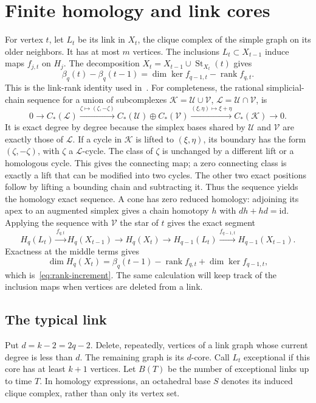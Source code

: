 \documentclass[11pt]{article}
\theoremstyle{remark}\newtheorem{remark}[theorem]{Remark}
\DeclareMathOperator{\rank}{rank}
\begin{document}
\section{Finite homology and link cores}\label{sec:homology}
For vertex $t$, let $L_t$ be its link in $X_t$, the clique complex of the
simple graph on its older neighbors. It has at most $m$ vertices.
The inclusions $L_t\subset X_{t-1}$ induce maps $f_{j,t}$ on $H_j$.
The decomposition $X_t=X_{t-1}\cup\operatorname{St}_{X_t}(t)$ gives
\begin{equation}\label{eq:rank-increment}
 \beta_q(t)-\beta_q(t-1)
 =\dim\ker f_{q-1,t}-\rank f_{q,t}.
\end{equation}
This is the link-rank identity used in~\cite[Proposition~14 of the
author preprint]{ssyh}.
For completeness, the rational simplicial-chain sequence for a union of
subcomplexes $\mathcal K=\mathcal U\cup\mathcal V$, $\mathcal L=\mathcal U\cap\mathcal V$, is
\[
 0\longrightarrow C_*(\mathcal L)\xrightarrow{\zeta\mapsto(\zeta,-\zeta)}
 C_*(\mathcal U)\oplus C_*(\mathcal V)\xrightarrow{(\xi,\eta)\mapsto\xi+\eta}
 C_*(\mathcal K)\longrightarrow0.
\]
It is exact degree by degree because the simplex bases shared by $\mathcal U$ and
$\mathcal V$ are exactly those of $\mathcal L$. If a cycle in $\mathcal K$ is lifted to $(\xi,\eta)$,
its boundary has the form $(\zeta,-\zeta)$, with $\zeta$ a $\mathcal L$-cycle. The class of
$\zeta$ is unchanged by a different lift or a homologous cycle. This gives the
connecting map; a zero connecting class is exactly a lift that can be
modified into two cycles. The other two exact positions follow by lifting
a bounding chain and subtracting it. Thus the sequence yields the homology
exact sequence. A cone has zero reduced homology: adjoining its apex to
an augmented simplex gives a chain homotopy $h$ with $dh+hd=\mathrm{id}$.
Applying the sequence with $\mathcal V$ the star of $t$ gives the exact segment
\[
 H_q(L_t)\xrightarrow{f_{q,t}}H_q(X_{t-1})\longrightarrow H_q(X_t)
 \longrightarrow H_{q-1}(L_t)\xrightarrow{f_{q-1,t}}H_{q-1}(X_{t-1}).
\]
Exactness at the middle terms gives
\[
 \dim H_q(X_t)=\beta_q(t-1)-\rank f_{q,t}+\dim\ker f_{q-1,t},
\]
which is~\eqref{eq:rank-increment}. The same calculation will keep track of the inclusion
maps when vertices are deleted from a link.

\subsection{The typical link}
Put $d=k-2=2q-2$. Delete, repeatedly, vertices of a link graph whose
current degree is less than $d$. The remaining graph is its $d$-core.
Call $L_t$ exceptional if this core has at least $k+1$ vertices.
Let $B(T)$ be the number of exceptional links up to time $T$.
In homology expressions, an octahedral base $S$ denotes its induced clique
complex, rather than only its vertex set.
\end{document}
